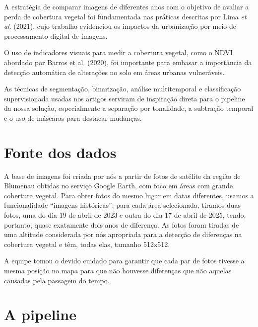 \documentclass{article}
\begin{document}
A estratégia de comparar imagens de diferentes anos com o objetivo de avaliar a perda de cobertura vegetal foi fundamentada nas práticas descritas por Lima \textit{et al}. (2021)\cite{artigo03}, cujo trabalho evidenciou os impactos da urbanização por meio de processamento digital de imagens.

O uso de indicadores visuais para medir a cobertura vegetal, como o NDVI abordado por Barros {et al}. (2020)\cite{artigo02}, foi importante para embasar a importância da detecção automática de alterações no solo em áreas urbanas vulneráveis.

As técnicas de segmentação, binarização, análise multitemporal e classificação supervisionada usadas nos artigos serviram de inspiração direta para o pipeline da nossa solução, especialmente a separação por tonalidade, a subtração temporal e o uso de máscaras para destacar mudanças.

\section{Fonte dos dados}

A base de imagens foi criada por nós a partir de fotos de satélite da região de Blumenau obtidas no serviço Google Earth, com foco em áreas com grande cobertura vegetal. Para obter fotos do mesmo lugar em datas diferentes, usamos a funcionalidade ``imagens históricas''; para cada área selecionada, tiramos duas fotos, uma do dia 19 de abril de 2023 e outra do dia 17 de abril de 2025, tendo, portanto, quase exatamente dois anos de diferença. As fotos foram tiradas de uma altitude considerada por nós apropriada para a detecção de diferenças na cobertura vegetal e têm, todas elas, tamanho 512x512.

A equipe tomou o devido cuidado para garantir que cada par de fotos tivesse a mesma posição no mapa para que não houvesse diferenças que não aquelas causadas pela passagem do tempo.

\section{A pipeline}
\end{document}
